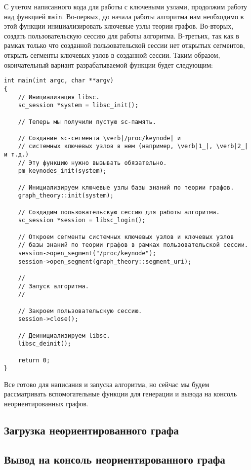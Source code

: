 С учетом написанного кода для работы с ключевыми узлами, продолжим
работу над функцией \lstinline|main|. Во-первых, до начала работы
алгоритма нам необходимо в этой функции инициализировать ключевые узлы
теории графов. Во-вторых, создать пользовательскую сессию для работы
алгоритма. В-третьих, так как в рамках только что созданной
пользовательской сессии нет открытых сегментов, открыть сегменты
ключевых узлов в созданной сессии. Таким образом, окончательный
вариант разрабатываемой функции будет следующим:
\begin{lstlisting}[texcl]
int main(int argc, char **argv)
{
    // Инициализация libsc.
    sc_session *system = libsc_init();

    // Теперь мы получили пустую sc-память.

    // Создание sc-сегмента \verb|/proc/keynode| и
    // системных ключевых узлов в нем (например, \verb|1_|, \verb|2_| и т.д.)
    // Эту функцию нужно вызывать обязательно.
    pm_keynodes_init(system);

    // Инициализируем ключевые узлы базы знаний по теории графов.
    graph_theory::init(system);

    // Создадим пользовательскую сессию для работы алгоритма.
    sc_session *session = libsc_login();

    // Откроем сегменты системных ключевых узлов и ключевых узлов
    // базы знаний по теории графов в рамках пользовательской сессии.
    session->open_segment("/proc/keynode");
    session->open_segment(graph_theory::segment_uri);

    //
    // Запуск алгоритма.
    //

    // Закроем пользовательскую сессию.
    session->close();

    // Деинициализируем libsc.
    libsc_deinit();

    return 0;
}
\end{lstlisting}

Все готово для написания и запуска алгоритма, но сейчас мы будем
рассматривать вспомогательные функции для генерации и вывода на
консоль неориентированных графов.

\subsection{Загрузка неориентированного графа}
\label{sec:libscprg_load_graph}

\subsection{Вывод на консоль неориентированного графа}
\label{sec:libscprg_print_graph}

